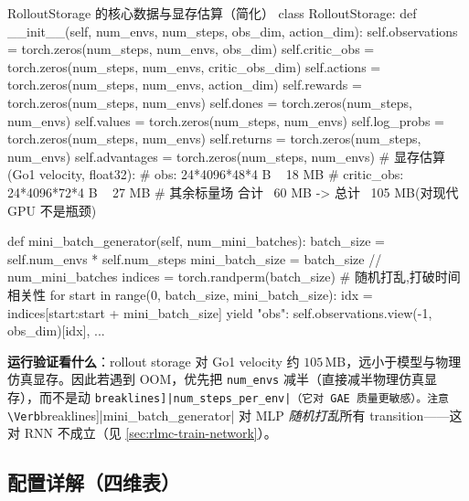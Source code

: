\begin{codebox}[Python]{RolloutStorage 的核心数据与显存估算（简化）}
class RolloutStorage:
    def __init__(self, num_envs, num_steps, obs_dim, action_dim):
        self.observations = torch.zeros(num_steps, num_envs, obs_dim)
        self.critic_obs   = torch.zeros(num_steps, num_envs, critic_obs_dim)
        self.actions      = torch.zeros(num_steps, num_envs, action_dim)
        self.rewards      = torch.zeros(num_steps, num_envs)
        self.dones        = torch.zeros(num_steps, num_envs)
        self.values       = torch.zeros(num_steps, num_envs)
        self.log_probs    = torch.zeros(num_steps, num_envs)
        self.returns      = torch.zeros(num_steps, num_envs)
        self.advantages   = torch.zeros(num_steps, num_envs)
        # 显存估算(Go1 velocity, float32):
        # obs:        24*4096*48*4 B ~ 18 MB
        # critic_obs: 24*4096*72*4 B ~ 27 MB
        # 其余标量场 合计 ~60 MB  ->  总计 ~105 MB(对现代 GPU 不是瓶颈)

    def mini_batch_generator(self, num_mini_batches):
        batch_size = self.num_envs * self.num_steps
        mini_batch_size = batch_size // num_mini_batches
        indices = torch.randperm(batch_size)        # 随机打乱,打破时间相关性
        for start in range(0, batch_size, mini_batch_size):
            idx = indices[start:start + mini_batch_size]
            yield {"obs": self.observations.view(-1, obs_dim)[idx], ...}
\end{codebox}

\textbf{运行验证看什么}：rollout storage 对 Go1 velocity 约 $105\,$MB，远小于模型与物理仿真显存。因此若遇到 OOM，优先把 \verb|num_envs| 减半（直接减半物理仿真显存），而不是动 \Verb[breaklines]|num_steps_per_env|（它对 GAE 质量更敏感）。注意 \Verb[breaklines]|mini_batch_generator| 对 MLP \emph{随机打乱}所有 transition——这对 RNN 不成立（见 \cref{sec:rlmc-train-network}）。

\subsection{配置详解（四维表）}

